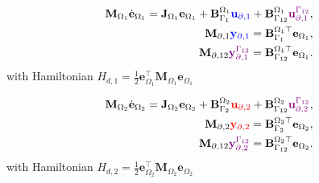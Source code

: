 \begin{tcbraster}[raster columns=2, raster equal height]
	\begin{tcolorbox}[width=0.48\textwidth, nobeforeafter, colframe=cyan,title=System \eqref{eq:pHlinsys_findim_Om1},  coltitle=black]%
	\begin{equation}\label{eq:pHfindim_Om1}
	\begin{aligned}
	\mathbf{M}_{\Omega_1}
	\dot{\mathbf{e}}_{\Omega_1}
	= \mathbf{J}_{\Omega_1} {\mathbf{e}}_{\Omega_1} + 
	\mathbf{B}_{\Gamma_1}^{\Omega_1} \textcolor{blue}{\mathbf{u}_{\partial, 1}} + \mathbf{B}_{\Gamma_{12}}^{\Omega_1}
	\textcolor{violet}{\mathbf{u}_{\partial, 1}^{\Gamma_{12}}}, \\
	\mathbf{M}_{\partial, 1} \textcolor{blue}{\mathbf{y}_{\partial, 1}} = \mathbf{B}_{\Gamma_1}^{\Omega_1 \top} \mathbf{e}_{\Omega_1}, \\
	\mathbf{M}_{\partial, 12} \textcolor{violet}{\mathbf{y}_{\partial, 1}^{\Gamma_{12}}} = \mathbf{B}_{\Gamma_{12}}^{\Omega_1 \top} \mathbf{e}_{\Omega_1}.
	\end{aligned}
	\end{equation}
	with Hamiltonian $H_{d, 1} = \frac{1}{2} {\mathbf{e}}_{\Omega_1}^\top \mathbf{M}_{\Omega_1}
	{\mathbf{e}}_{\Omega_1}$
	\end{tcolorbox} 
	\begin{tcolorbox}[width=0.48\textwidth, nobeforeafter,  colframe=lightyellow,title=System \eqref{eq:pHlinsys_findim_Om2}, coltitle=black]%
	\begin{equation}\label{eq:pHfindim_Om2}
	\begin{aligned}
	\mathbf{M}_{\Omega_2}
	\dot{\mathbf{e}}_{\Omega_2}
	= \mathbf{J}_{\Omega_2} {\mathbf{e}}_{\Omega_2} + 
	\mathbf{B}_{\Gamma_2}^{\Omega_2} \textcolor{red}{\mathbf{u}_{\partial, 2}} + \mathbf{B}_{\Gamma_{12}}^{\Omega_2}
	\textcolor{violet}{\mathbf{u}_{\partial, 2}^{\Gamma_{12}}}, \\
	\mathbf{M}_{\partial, 2} \textcolor{red}{\mathbf{y}_{\partial, 2}} = \mathbf{B}_{\Gamma_2}^{\Omega_2 \top} \mathbf{e}_{\Omega_2}, \\
	\mathbf{M}_{\partial, 12} \textcolor{violet}{\mathbf{y}_{\partial, 2}^{\Gamma_{12}}} = \mathbf{B}_{\Gamma_{12}}^{\Omega_2 \top} \mathbf{e}_{\Omega_2}.
	\end{aligned}
	\end{equation}
	with Hamiltonian $H_{d, 2} = \frac{1}{2} {\mathbf{e}}_{\Omega_2}^\top \mathbf{M}_{\Omega_2}
	{\mathbf{e}}_{\Omega_2}$
	\end{tcolorbox}
\end{tcbraster}

